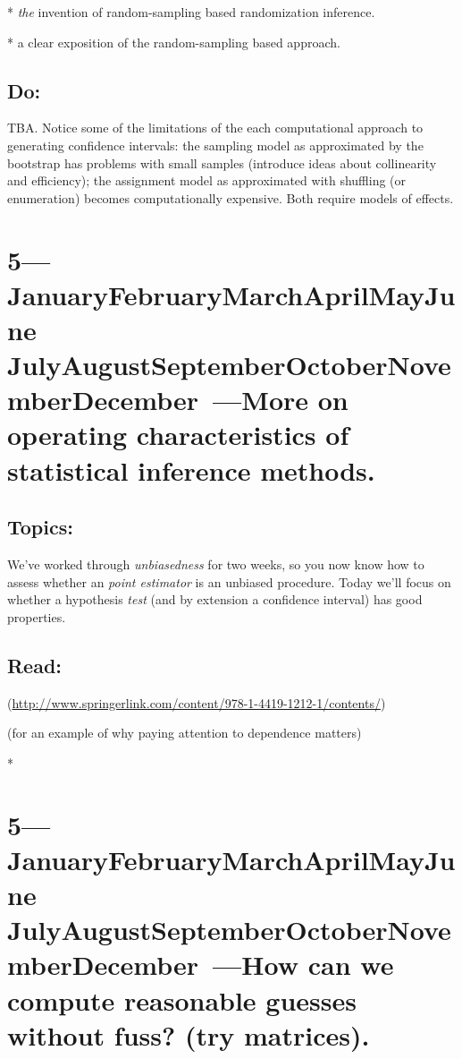 \documentclass[10pt]{article}
\def\themonth{\ifcase\month\or
  January\or February\or March\or April\or May\or June\or
  July\or August\or September\or October\or November\or December\fi}
\begin{document}
*\citealp{neyman:1923,rubin1990apt} \emph{the} invention of
random-sampling based randomization inference.

*\citealp[Chap 2.7]{lohr:1999} a clear exposition of the
random-sampling based approach.

\subsection{Do:} TBA. Notice some of the limitations
of the each computational approach to generating confidence intervals:
the sampling model as approximated by the bootstrap has problems with
small samples (introduce ideas about collinearity and efficiency); the
assignment model as approximated with shuffling (or enumeration)
becomes computationally expensive. Both require models of effects.

\AdvanceDate[7]
\section{5---\themonth~\the\day---More on operating characteristics of
  statistical inference methods.}

\subsection{Topics:} We've worked through \emph{unbiasedness} for two
weeks, so you now know how to assess whether an \emph{point estimator} is an
unbiased procedure. Today we'll focus on whether a hypothesis \emph{test} (and by
extension a confidence interval) has good properties.

\subsection{Read:}

\citealp[Glossary]{rosenbaum2010design}  (\url{http://www.springerlink.com/content/978-1-4419-1212-1/contents/})

\citealp{bertrand2004msw} (for an example of why paying attention to dependence matters)

*\citealp[Chap 9 and especially 9.3]{trosset2009isi}

\AdvanceDate[7]
\section{5---\themonth~\the\day---How can we compute reasonable guesses without
  fuss? (try matrices).}
\end{document}
